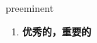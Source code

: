 
\begin{frame}
{\huge preeminent}
\begin{center}
\begin{enumerate}\Large
  \item \textbf{优秀的，重要的}
\end{enumerate}
\end{center}
\end{frame}
